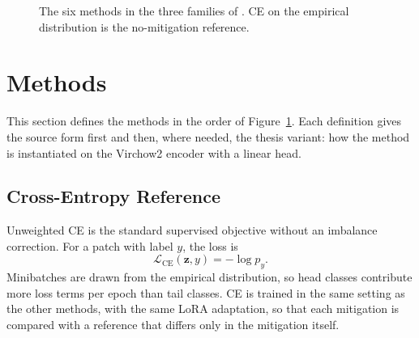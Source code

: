\documentclass[11pt]{article}
\begin{document}
\begin{figure}[ht]
  \centering
  \caption{The six methods in the three families of \citet{krawczyk2016learning}. CE on the empirical distribution is the no-mitigation reference.}
  \label{fig:taxonomy}
\end{figure}

\section{Methods}
\label{sec:methods}
This section defines the methods in the order of Figure~\ref{fig:taxonomy}. Each definition gives the source form first and then, where needed, the thesis variant: how the method is instantiated on the Virchow2 encoder with a linear head.

\subsection{Cross-Entropy Reference}
Unweighted CE is the standard supervised objective without an imbalance correction. For a patch with label $y$, the loss is
\begin{equation}
  \mathcal L_{\mathrm{CE}}(\mathbf z,y)=-\log p_y.
  \label{eq:ce}
\end{equation}
\noindent Minibatches are drawn from the empirical distribution, so head classes contribute more loss terms per epoch than tail classes. CE is trained in the same setting as the other methods, with the same LoRA adaptation, so that each mitigation is compared with a reference that differs only in the mitigation itself.
\end{document}
